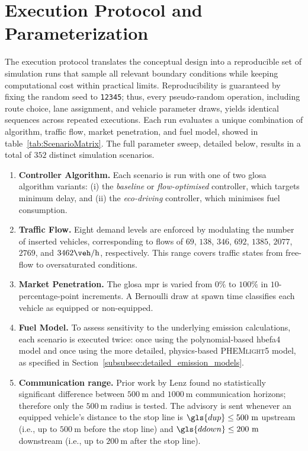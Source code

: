 \section{Execution Protocol and Parameterization}
\label{sec:exec_protocol}

The execution protocol translates the conceptual design into a reproducible set of simulation runs that sample all relevant boundary conditions while keeping computational cost within practical limits. Reproducibility is guaranteed by fixing the random seed to \texttt{12345}; thus, every pseudo-random operation, including route choice, lane assignment, and vehicle parameter draws, yields identical sequences across repeated executions.
\mynewline
Each run evaluates a unique combination of algorithm, traffic flow, market penetration, and fuel model, showed in table~\vref{tab:ScenarioMatrix}. The full parameter sweep, detailed below, results in a total of $352$ distinct simulation scenarios.
\mynewline

\begin{enumerate}
    \item \textbf{Controller Algorithm.} Each scenario is run with one of two \ac{glosa} algorithm variants: (i) the \emph{baseline} or \emph{flow-optimised} controller, which targets minimum delay, and (ii) the \emph{eco-driving} controller, which minimises fuel consumption.
    
    \item \textbf{Traffic Flow.} Eight demand levels are enforced by modulating the number of inserted vehicles, corresponding to flows of $69$, $138$, $346$, $692$, $1385$, $2077$, $2769$, and $3462\unit{\veh\per\hour}$, respectively. This range covers traffic states from free-flow to oversaturated conditions.
    
    \item \textbf{Market Penetration.} The \ac{glosa} \ac{mpr} is varied from $0\%$ to $100\%$ in $10$-percentage-point increments. A Bernoulli draw at spawn time classifies each vehicle as equipped or non-equipped.

    \item \textbf{Fuel Model.} To assess sensitivity to the underlying emission calculations, each scenario is executed twice: once using the polynomial-based \ac{hbefa}4 model and once using the more detailed, physics-based \textsc{PHEMlight}5 model, as specified in Section~\ref{subsubsec:detailed_emission_models}.

    \item \textbf{Communication range.} Prior work by Lenz \cite{Lenz2024} found no statistically significant difference between $500~\unit{\meter}$ and $1000~\unit{\meter}$ communication horizons; therefore only the $500~\unit{\meter}$ radius is tested. The advisory is sent whenever an equipped vehicle’s distance to the stop line is $\gls{dup} \leq 500~\unit{\meter}$ upstream (i.e., up to $500~\unit{\meter}$ before the stop line) and $\gls{ddown} \leq 200~\unit{\meter}$ downstream (i.e., up to $200~\unit{\meter}$ after the stop line).
\end{enumerate}

